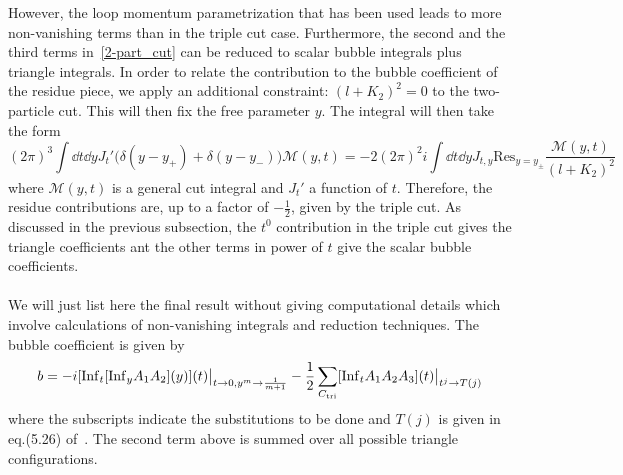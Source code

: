 However, the loop momentum parametrization that has been used leads to more non-vanishing terms than in the triple cut case. 
Furthermore, the second and the third terms in~\cref{2-part_cut} can be reduced to scalar bubble integrals plus triangle integrals. 
In order to relate the contribution to the bubble coefficient of the residue piece, we apply an additional constraint: $(l+K_2)^2=0$ to the two-particle cut.
This will then fix the free parameter $y$.
The integral will then take the form
\begin{equation*}
(2\pi)^3\int \dd t \dd y J_t'\big(\delta(y-y_+) + \delta(y-y_-)\big) \mathcal{M}(y,t) = -2(2\pi)^2 i \int \dd t \dd y J_{t,y}\mathrm{Res}_{y = y_{\pm}}\frac{\mathcal{M}(y,t)}{(l+K_2)^2}
\end{equation*}
where $\mathcal{M}(y,t)$ is a general cut integral and $J_t'$ a function of $t$.
Therefore, the residue contributions are, up to a factor of $-\frac{1}{2}$, given by the triple cut.
As discussed in the previous subsection, the $t^0$ contribution in the triple cut gives the triangle coefficients ant the other terms in power of $t$ give the scalar bubble coefficients.
\\\\
We will just list here the final result without giving computational details which involve calculations of non-vanishing integrals and reduction techniques.
The bubble coefficient is given by
\begin{equation*}
b = -i[\mathrm{Inf}_t[\mathrm{Inf}_y A_1 A_2](y)](t)\big|_{t\rightarrow 0 , y^m\rightarrow \frac{1}{m+1}}
-\frac{1}{2}\sum_{C_{\mathrm{tri}}}[\mathrm{Inf}_t A_1A_2A_3](t)\big|_{t^j\rightarrow T(j)}
\end{equation*}
where the subscripts indicate the substitutions to be done and $T(j)$ is given in eq.(5.26) of~\cite{Forde:2007mi}. 
The second term above is summed over all possible triangle configurations.
\\\\
\iffalse
As an example, let us cite briefly how the two-mass linear triangle
\begin{equation*}
(2\pi)^2\int\dd^4 l \prod_{i=0}^1\delta(l_i^2)\frac{\langle K_2|\slashed{l}|K_1]}{(l+K_2)^2}
\end{equation*}
is treated in~\cite{Forde:2007mi}:
\begin{enumerate}
\item Do a two-particle cut. We will then get two terms in the integrand: one in $y^0$ and a residual term. The term in $y^0$ gives us a contribution to the bubble coefficients; while the residual term means that a triple cut is needed to get the contributions to the bubble and triangle contributions.
%
\item Apply a triple cut. There will be a term in $t$ if we choose the parametrization introduced previously, which encodes information on the bubble coefficients.
%
\item This term then requires the knowledge of $\int \dd t J_t' t$, which can be re-expressed in terms of our parametrization. Then, apply the Passarino-Veltman reduction to get the relationsship between $\int \dd tJ_t' t$ and the cut bubble $B_0^{\mathrm{cut}(K_1^2)}$
\end{enumerate}
\fi
%
%
%
